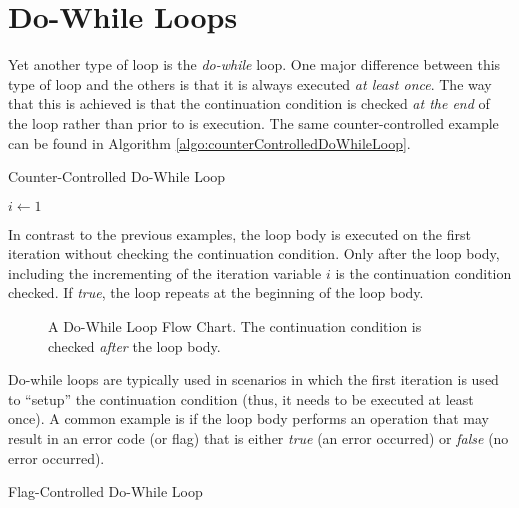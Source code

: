 \section{Do-While Loops}

Yet another type of loop is the \emph{do-while} loop.  One major difference between this
type of loop and the others is that it is always executed \emph{at least once}.  The way that
this is achieved is that the continuation condition is checked \emph{at the end} of the loop
rather than prior to is execution.  The same counter-controlled example can be found in
Algorithm \ref{algo:counterControlledDoWhileLoop}.

\begin{algorithm}[h]
\caption{Counter-Controlled Do-While Loop}
\label{algo:counterControlledDoWhileLoop}
$i \leftarrow 1$ \;
\end{algorithm}

In contrast to the previous examples, the loop body is executed on the first iteration without
checking the continuation condition.  Only after the loop body, including the incrementing of 
the iteration variable $i$ is the continuation condition checked.  If \emph{true}, the loop repeats
at the beginning of the loop body.

\begin{figure}[!h]
\centering

\caption{A Do-While Loop Flow Chart.  The continuation condition is checked \emph{after} the loop body.}
\label{figure:doWhileLoopFlowChart}
\end{figure}

Do-while loops are typically used in scenarios in which the first iteration is used to ``setup'' 
the continuation condition (thus, it needs to be executed at least once).  A common example
is if the loop body performs an operation that may result in an error code (or flag) that is
either \emph{true} (an error occurred) or \emph{false} (no error occurred).  

\begin{algorithm}[h]
\caption{Flag-Controlled Do-While Loop}
\label{algo:flagControlledDoWhileLoop}
\end{algorithm}

